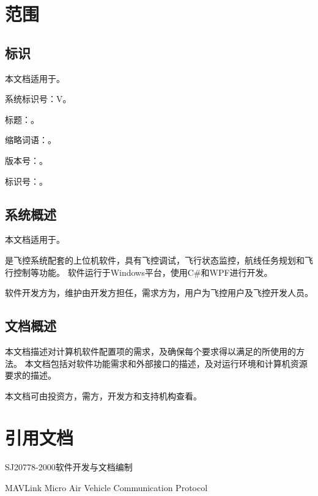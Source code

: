 
\section{范围}
\subsection{标识}
本文档适用于\csciname。

系统标识号：\csciname V\csciver。

标题：\csciname。

缩略词语：\csciabbr。

版本号：\csciver。

标识号：\csciver。

\subsection{系统概述}
本文档适用于\csciname。

\csciname 是\cscidem 飞控系统配套的上位机软件，具有飞控调试，飞行状态监控，航线任务规划和飞行控制等功能。
软件运行于Windows平台，使用C\#和WPF进行开发。

软件开发方为\cscidev，维护由开发方担任，需求方为\cscidem，用户为\cscidem 飞控用户及飞控开发人员。


\subsection{文档概述}
本文档描述对计算机软件配置项的需求，及确保每个要求得以满足的所使用的方法。
本文档包括对软件功能需求和外部接口的描述，及对运行环境和计算机资源要求的描述。

本文档可由投资方，需方，开发方和支持机构查看。

\section{引用文档}
SJ20778-2000软件开发与文档编制

MAVLink Micro Air Vehicle Communication Protocol

\endinput
